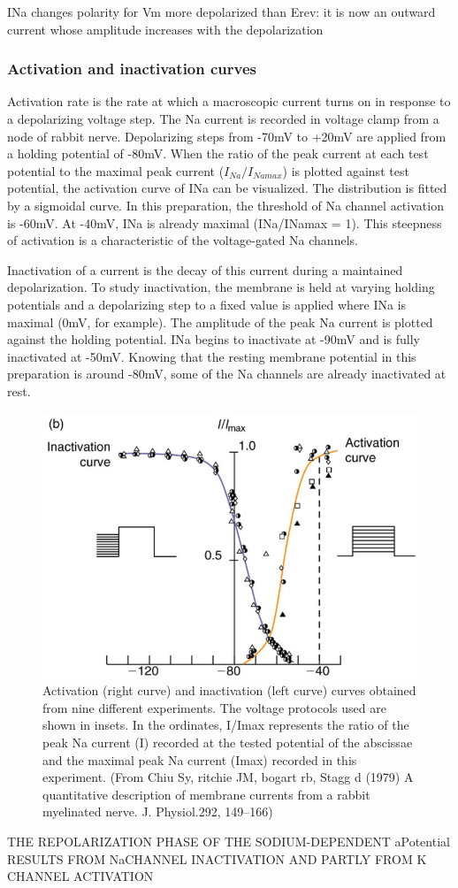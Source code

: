 \documentclass[../../Orator]{subfiles}
\begin{document}
INa changes polarity for Vm more depolarized than Erev: it is now an outward current whose amplitude increases with the depolarization 

\subsubsection{Activation and inactivation curves }
Activation rate is the rate at which a macroscopic current turns on in response to a depolarizing voltage step. The \gls{Na} current is recorded in voltage clamp from a node of rabbit nerve. Depolarizing steps from -70mV to +20mV are applied from a holding potential of -80mV. When the ratio of the peak current at each test potential to the maximal peak current (\(I_{Na}/I_{Namax}\)) is plotted against test potential, the activation curve of INa can be visualized. The distribution is fitted by a sigmoidal curve. In this preparation, the threshold of \gls{Na} channel activation is -60mV. At -40mV, INa is already maximal (INa/INamax = 1). This steepness of activation is a characteristic of the voltage-gated \gls{Na} channels. 

Inactivation of a current is the decay of this current during a maintained depolarization. To study inactivation, the membrane is held at varying holding potentials and a depolarizing step to a fixed value is applied where INa is maximal (0mV, for example). The amplitude of the peak \gls{Na} current is plotted against the holding potential. INa begins to inactivate at -90mV and is fully inactivated at -50mV. Knowing that the resting membrane potential in this preparation is around -80mV, some of the \gls{Na} channels are already inactivated at rest. 
\begin{figure}[H]
    \centering
    \includegraphics[width=0.5\linewidth]{Pictures//Anakin/activ-inactiv.png}
    \caption{Activation (right curve) and inactivation (left curve) curves obtained from nine different experiments. The voltage protocols used are shown in insets. In the ordinates, I/Imax represents the ratio of the peak \gls{Na} current (I) recorded at the tested potential of the abscissae and the maximal peak \gls{Na} current (Imax) recorded in this experiment. (From Chiu Sy, ritchie JM, bogart rb, Stagg d (1979) A quantitative description of membrane currents from a rabbit myelinated nerve. J. Physiol.292, 149–166) }
    \label{fig:enter-label}
\end{figure}

THE REPOLARIZATION PHASE OF THE SODIUM-DEPENDENT \gls{aPotential} RESULTS FROM \gls{Na}CHANNEL INACTIVATION AND PARTLY FROM \gls{K} CHANNEL ACTIVATION 
\end{document}
